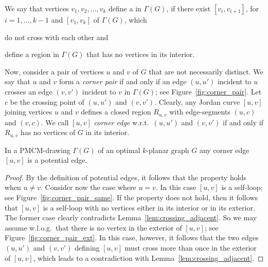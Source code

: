 We say that vertices $v_1,v_2,\dots,v_k$ define a \emph{\pp} in $\Gamma(G)$, if there exist \pes $[v_i,v_{i+1}]$, for $i=1,\dots, k-1$ and \pe $[v_1,v_k]$ of $\Gamma(G)$, which%
\begin{inparaenum}[(i)]
\item do not cross with each other and
\item define a region in $\Gamma(G)$ that has no vertices in its interior.
\end{inparaenum}
%

Now, consider a pair of vertices $u$ and $v$ of $G$ that are not necessarily distinct. We say that $u$ and $v$ form a \emph{corner pair} if and only if an edge $(u,u')$ incident to $u$ crosses an edge $(v,v')$ incident to $v$ in $\Gamma(G)$; see Figure~\ref{fig:corner_pair}. Let $c$ be the crossing point of $(u,u')$ and $(v,v')$. Clearly, any Jordan curve $[u,v]$ joining vertices $u$ and $v$ defines a closed region $R_{u,v}$ with edge-segments $(u,c)$ and $(v,c)$. We call $[u,v]$ \emph{corner edge} w.r.t.~$(u,u')$ and $(v,v')$ if and only if $R_{u,v}$ has no vertices of $G$ in its interior.   

\begin{property}
In a PMCM-drawing $\Gamma(G)$ of an optimal $k$-planar graph $G$ any corner edge $[u,v]$ is a potential edge.
\label{prp:corner}
\end{property}
\begin{proof}
By the definition of potential edges, it follows that the property holds when $u \neq v$. Consider now the case where $u=v$. In this case $[u,v]$ is a self-loop; see Figure~\ref{fig:corner_pair_same}. If the property does not hold, then it follows that $[u,v]$ is a self-loop with no vertices either in its interior or in its exterior. The former case clearly contradicts Lemma~\ref{lem:crossing_adjacent}. So we may assume w.l.o.g.~that there is no vertex in the exterior of $[u,v]$; see Figure~\ref{fig:corner_pair_ext}. In this case, however, it follows that the two edges $(u,u')$ and $(v,v')$ defining $[u,v]$ must cross more than once in the exterior of $[u,v]$, which leads to a contradiction with Lemma~\ref{lem:crossing_adjacent}.
\end{proof}

